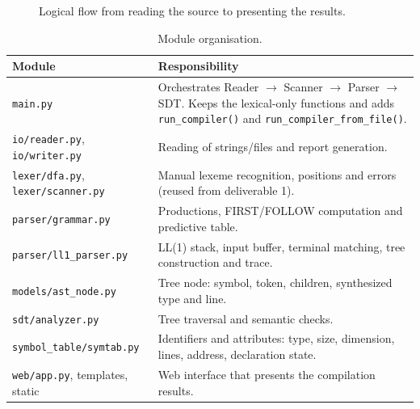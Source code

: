 \documentclass[11pt,a4paper]{article}
\begin{document}
\begin{figure}[H]
\centering
{}
\caption{Logical flow from reading the source to presenting the results.}
\label{fig:flow}
\end{figure}

\begin{table}[H]
\centering
\small
\begin{tabularx}{\textwidth}{@{}lX@{}}
\toprule
\textbf{Module} & \textbf{Responsibility}\\
\midrule
\texttt{main.py} & Orchestrates Reader $\to$ Scanner $\to$ Parser $\to$ SDT. Keeps the lexical-only functions and adds \texttt{run\_compiler()} and \texttt{run\_compiler\_from\_file()}.\\
\texttt{io/reader.py}, \texttt{io/writer.py} & Reading of strings/files and report generation.\\
\texttt{lexer/dfa.py}, \texttt{lexer/scanner.py} & Manual lexeme recognition, positions and errors (reused from deliverable 1).\\
\texttt{parser/grammar.py} & Productions, FIRST/FOLLOW computation and predictive table.\\
\texttt{parser/ll1\_parser.py} & LL(1) stack, input buffer, terminal matching, tree construction and trace.\\
\texttt{models/ast\_node.py} & Tree node: symbol, token, children, synthesized type and line.\\
\texttt{sdt/analyzer.py} & Tree traversal and semantic checks.\\
\texttt{symbol\_table/symtab.py} & Identifiers and attributes: type, size, dimension, lines, address, declaration state.\\
\texttt{web/app.py}, templates, static & Web interface that presents the compilation results.\\
\bottomrule
\end{tabularx}
\caption{Module organisation.}
\end{table}
\end{document}
